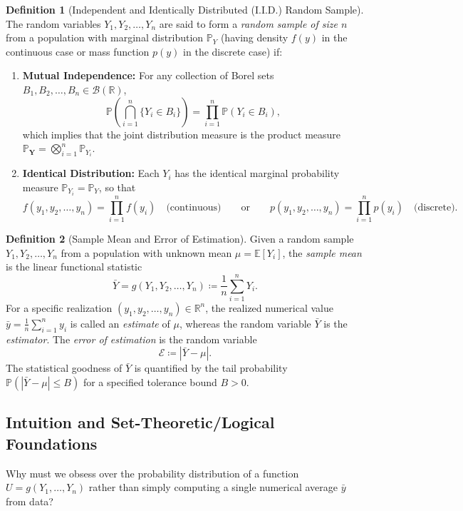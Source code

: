 \documentclass[11pt, letterpaper]{article}
\theoremstyle{definition}
\newtheorem{definition}{Definition}[section]
\theoremstyle{remark}
\newcommand{\R}{\mathbb{R}}
\newcommand{\E}{\mathbb{E}}
\newcommand{\Prob}{\mathbb{P}}
\begin{document}
\begin{definition}[Independent and Identically Distributed (I.I.D.) Random Sample]
The random variables $Y_1, Y_2, \dots, Y_n$ are said to form a \emph{random sample of size $n$} from a population with marginal distribution $\Prob_Y$ (having density $f(y)$ in the continuous case or mass function $p(y)$ in the discrete case) if:
\begin{enumerate}[label=(\roman*)]
    \item \textbf{Mutual Independence:} For any collection of Borel sets $B_1, B_2, \dots, B_n \in \mathcal{B}(\R)$,
    \[
        \Prob\left(\bigcap_{i=1}^{n} \{Y_i \in B_i\}\right) = \prod_{i=1}^{n} \Prob(Y_i \in B_i),
    \]
    which implies that the joint distribution measure is the product measure $\Prob_{\mathbf{Y}} = \bigotimes_{i=1}^{n} \Prob_{Y_i}$.
    \item \textbf{Identical Distribution:} Each $Y_i$ has the identical marginal probability measure $\Prob_{Y_i} = \Prob_Y$, so that
    \[
        f(y_1, y_2, \dots, y_n) = \prod_{i=1}^{n} f(y_i) \quad \text{(continuous)} \qquad \text{or} \qquad p(y_1, y_2, \dots, y_n) = \prod_{i=1}^{n} p(y_i) \quad \text{(discrete)}.
    \]
\end{enumerate}
\end{definition}

\begin{definition}[Sample Mean and Error of Estimation]
Given a random sample $Y_1, Y_2, \dots, Y_n$ from a population with unknown mean $\mu = \E[Y_i]$, the \emph{sample mean} is the linear functional statistic
\[
    \bar{Y} = g(Y_1, Y_2, \dots, Y_n) \coloneqq \frac{1}{n} \sum_{i=1}^{n} Y_i.
\]
For a specific realization $(y_1, y_2, \dots, y_n) \in \R^n$, the realized numerical value $\bar{y} = \frac{1}{n}\sum_{i=1}^n y_i$ is called an \emph{estimate} of $\mu$, whereas the random variable $\bar{Y}$ is the \emph{estimator}. The \emph{error of estimation} is the random variable
\[
    \mathcal{E} \coloneqq |\bar{Y} - \mu|.
\]
The statistical goodness of $\bar{Y}$ is quantified by the tail probability $\Prob(|\bar{Y} - \mu| \le B)$ for a specified tolerance bound $B > 0$.
\end{definition}

\subsection{Intuition and Set-Theoretic/Logical Foundations}

Why must we obsess over the probability distribution of a function $U = g(Y_1, \dots, Y_n)$ rather than simply computing a single numerical average $\bar{y}$ from data? 
\end{document}
